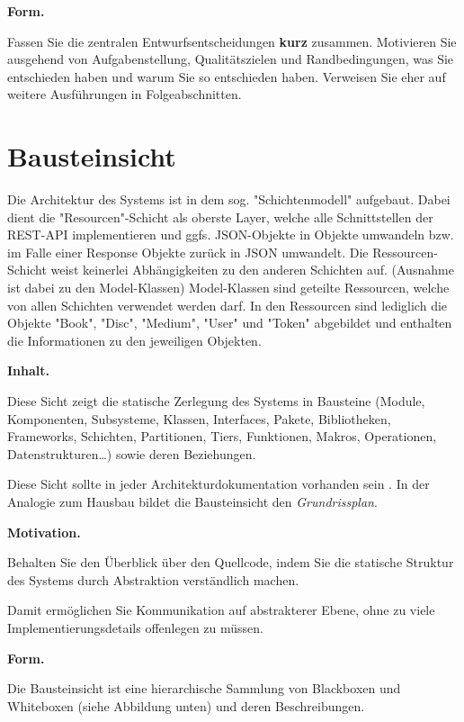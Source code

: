 \documentclass[]{article}
\begin{document}
\textbf{Form.}

Fassen Sie die zentralen Entwurfsentscheidungen \textbf{kurz} zusammen.
Motivieren Sie ausgehend von Aufgabenstellung, Qualitätszielen und
Randbedingungen, was Sie entschieden haben und warum Sie so entschieden
haben. Verweisen Sie eher auf weitere Ausführungen in Folgeabschnitten.

\section{Bausteinsicht}\label{section-building-block-view}
Die Architektur des Systems ist in dem sog. "Schichtenmodell" aufgebaut. Dabei dient die "Resourcen"-Schicht als oberste Layer, welche alle Schnittstellen der REST-API implementieren und ggfs. JSON-Objekte in Objekte umwandeln bzw. im Falle einer Response Objekte zurück in JSON umwandelt. Die Ressourcen-Schicht weist keinerlei Abhängigkeiten zu den anderen Schichten auf. (Ausnahme ist dabei zu den Model-Klassen)
Model-Klassen sind geteilte Ressourcen, welche von allen Schichten verwendet werden darf. In den Ressourcen sind lediglich die Objekte "Book", "Disc", "Medium", "User" und "Token" abgebildet und enthalten die Informationen zu den jeweiligen Objekten.

\textbf{Inhalt.}


Diese Sicht zeigt die statische Zerlegung des Systems in Bausteine
(Module, Komponenten, Subsysteme, Klassen, Interfaces, Pakete,
Bibliotheken, Frameworks, Schichten, Partitionen, Tiers, Funktionen,
Makros, Operationen, Datenstrukturen\ldots{}) sowie deren Beziehungen.

Diese Sicht sollte in jeder Architekturdokumentation vorhanden sein . In
der Analogie zum Hausbau bildet die Bausteinsicht den
\emph{Grundrissplan}.

\textbf{Motivation.}

Behalten Sie den Überblick über den Quellcode, indem Sie die statische
Struktur des Systems durch Abstraktion verständlich machen.

Damit ermöglichen Sie Kommunikation auf abstrakterer Ebene, ohne zu
viele Implementierungsdetails offenlegen zu müssen.

\textbf{Form.}

Die Bausteinsicht ist eine hierarchische Sammlung von Blackboxen und
Whiteboxen (siehe Abbildung unten) und deren Beschreibungen.
\end{document}
